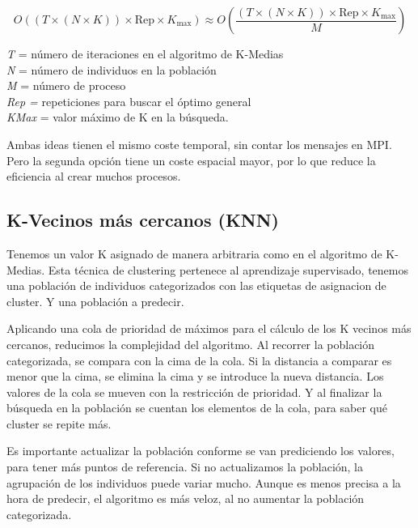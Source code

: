 		\begin{mdframed}[roundcorner=5pt]
			\[
			O((T \times (N \times K)) \times \text{Rep} \times K_{\text{max}}) \approx O\left(\frac{{(T \times (N \times K)) \times \text{Rep} \times K_{\text{max}}}}{{M}}\right)
			\]
			
			
			\begin{tcolorbox}[boxrule=0.5pt, fontupper=\small]
				
				\textit{T} = número de iteraciones en el algoritmo de K-Medias\\
				\textit{N} = número de individuos en la población\\
				\textit{M} = número de proceso\\
				\textit{Rep = }repeticiones para buscar el óptimo general\\
				\textit{KMax} = valor máximo de K en la búsqueda.				
				
			\end{tcolorbox}
			
		\end{mdframed}
		
		Ambas ideas tienen el mismo coste temporal, sin contar los mensajes en MPI. Pero la segunda opción tiene un coste espacial mayor, por lo que reduce la eficiencia al crear muchos procesos.
		
		
	\subsection{K-Vecinos más cercanos (KNN)}
		Tenemos un valor K  asignado de manera arbitraria como en el algoritmo de K-Medias. Esta técnica de clustering pertenece al aprendizaje supervisado, tenemos una población de individuos categorizados con las etiquetas de asignacion de cluster. Y una población a predecir.
		
		Aplicando una cola de prioridad de máximos para el cálculo de los K vecinos más cercanos, reducimos la complejidad del algoritmo. Al recorrer la población categorizada, se compara con la cima de la cola. Si la distancia a comparar es menor que la cima, se elimina la cima y se introduce la nueva distancia. Los valores de la cola se mueven con la restricción de prioridad. Y al finalizar la búsqueda en la población se cuentan los elementos de la cola, para saber qué cluster se repite más.
		
		Es importante actualizar la población conforme se van prediciendo los valores, para tener más puntos de referencia. Si no actualizamos la población, la agrupación de los individuos puede variar mucho. Aunque es menos precisa a la hora de predecir, el algoritmo es más veloz, al no aumentar la población categorizada.
		
